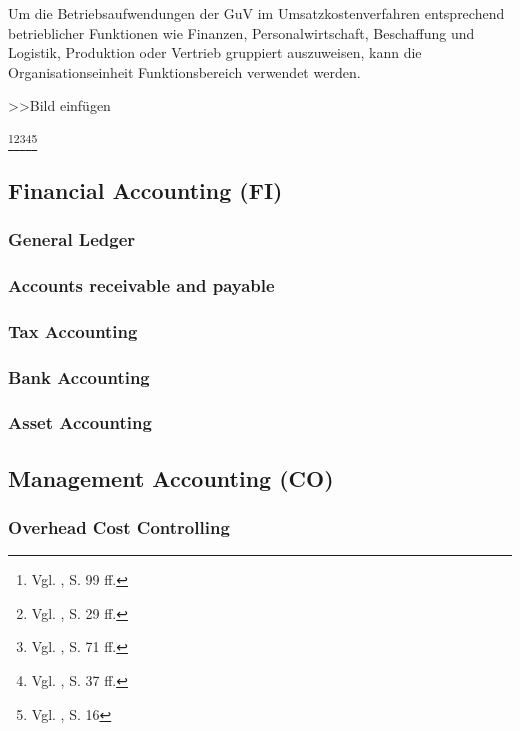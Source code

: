 Um die Betriebsaufwendungen der GuV im Umsatzkostenverfahren entsprechend betrieblicher Funktionen wie Finanzen, Personalwirtschaft, Beschaffung und Logistik, Produktion oder Vertrieb gruppiert auszuweisen, kann die Organisationseinheit Funktionsbereich verwendet werden.

>>Bild einfügen

\footnote{Vgl. \cite{Hefner2001}, S. 99 ff.}\footnote{Vgl. \cite{Friedl2008}, S. 29 ff.}\footnote{Vgl. \cite{Maassen2006}, S. 71 ff.}\footnote{Vgl. \cite{Patel2009}, S. 37 ff.}\footnote{Vgl. \cite{Padhi2011}, S. 16} 



\subsection{Financial Accounting (FI)} %
\subsubsection{General Ledger} %
\subsubsection{Accounts receivable and payable} %
\subsubsection{Tax Accounting} %

\subsubsection{Bank Accounting} %
\subsubsection{Asset Accounting} %

\subsection{Management Accounting (CO)} %
\subsubsection{Overhead Cost Controlling}


